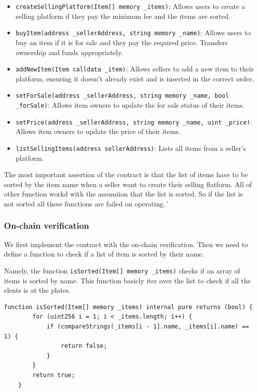 \documentclass[runningheads]{llncs}
\begin{document}
\begin{itemize}
 \item \texttt{createSellingPlatform(Item[] memory \_items)}:
Allows users to create a selling platform if they pay the minimum fee and the items are sorted.

 \item \texttt{buyItem(address \_sellerAddress, string memory \_name)}:
Allows users to buy an item if it is for sale and they pay the required price. Transfers ownership and funds appropriately.

 \item \texttt{addNewItem(Item calldata \_item)}:
Allows sellers to add a new item to their platform, ensuring it doesn't already exist and is inserted in the correct order.

 \item \texttt{setForSale(address \_sellerAddress, string memory \_name, bool \_forSale)}:
Allows item owners to update the for sale status of their items.
 \item \texttt{setPrice(address \_sellerAddress, string memory \_name, uint \_price)}:
Allows item owners to update the price of their items.
\item \texttt{listSellingItems(address sellerAddress)}:
Lists all items from a seller's platform.
\end{itemize}

The most important assertion of the contract is that the list of items have to be sorted by the item name when a seller want to create their selling flatform. All of other function workd with the assumiion that the list is sorted. So if the list is not sorted all these functions are failed on operating.´
\subsubsection{On-chain verification}
We first implement the contract with the on-chain verification. Then we need to define a function to check if a list of item is sorted by their name. 

Namely, the function \texttt{isSorted(Item[] memory \_items)} checks if an array of items is sorted by name. This function basicly iter over the list to check if all the elents is at the plates.

\begin{lstlisting}[numbers=none]
   function isSorted(Item[] memory _items) internal pure returns (bool) {
        for (uint256 i = 1; i < _items.length; i++) {
            if (compareStrings(_items[i - 1].name, _items[i].name) == 1) {
                return false;
            }
        }
        return true;
    }
\end{lstlisting}
\end{document}
